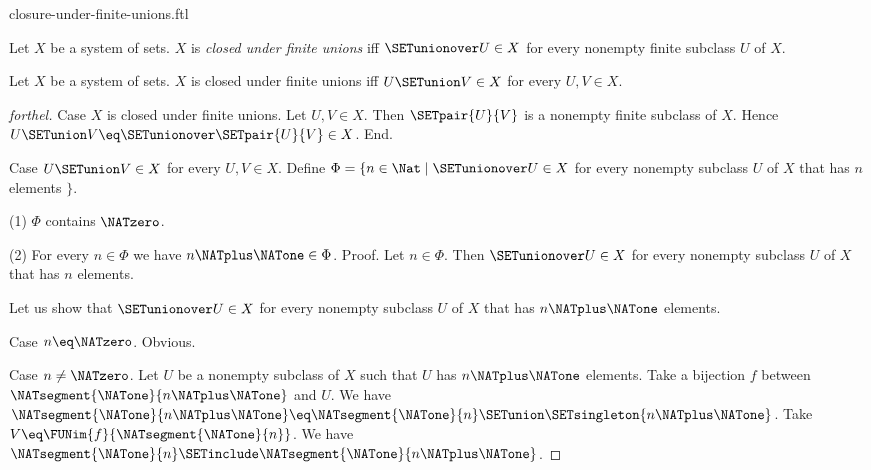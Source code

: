 \documentclass{naproche-library}
\begin{document}
\begin{smodule}[title=Closure Under Finite Unions]{closure-under-finite-unions.ftl}

\begin{definition}[forthel,id=FOUNDATIONS_14_7040118193913856]
  Let $X$ be a system of sets.
  $X$ is \emph{closed under finite unions} iff $\SETunionover U \in X$ for every nonempty finite subclass $U$ of $X$.
\end{definition}

\begin{proposition}[forthel,id=FOUNDATIONS_17_4164024962908160]
  Let $X$ be a system of sets.
  $X$ is closed under finite unions iff $U \SETunion V \in X$ for every $U, V \in X$.
\end{proposition}
\begin{proof}[forthel]
  Case $X$ is closed under finite unions.
    Let $U, V \in X$.
    Then $\SETpair{U}{V}$ is a nonempty finite subclass of $X$.
    Hence $U \SETunion V \eq \SETunionover \SETpair{U}{V} \in X$.
  End.

  Case $U \SETunion V \in X$ for every $U, V \in X$.
    Define $\Phi = \{ n \in \Nat \mid \SETunionover U \in X$ for every nonempty subclass $U$ of $X$ that has $n$ elements $\}$.

    (1) $\Phi$ contains $\NATzero$.

    (2) For every $n \in \Phi$ we have $n \NATplus \NATone \in \Phi$. \newline
    Proof.
      Let $n \in \Phi$.
      Then $\SETunionover U \in X$ for every nonempty subclass $U$ of $X$ that has $n$ elements.

      Let us show that $\SETunionover U \in X$ for every nonempty subclass $U$ of $X$ that has $n \NATplus \NATone$ elements.

        Case $n \eq \NATzero$. Obvious.

        Case $n \neq \NATzero$.
          Let $U$ be a nonempty subclass of $X$ such that $U$ has $n \NATplus \NATone$ elements.
          Take a bijection $f$ between $\NATsegment{\NATone}{n \NATplus \NATone}$ and $U$.
          We have $\NATsegment{\NATone}{n \NATplus \NATone} \eq \NATsegment{\NATone}{n} \SETunion \SETsingleton{n \NATplus \NATone}$.
          Take $V \eq \FUNim{f}{\NATsegment{\NATone}{n}}$.
          We have $\NATsegment{\NATone}{n} \SETinclude \NATsegment{\NATone}{n \NATplus \NATone}$.


\end{proof}
\end{smodule}
\end{document}
